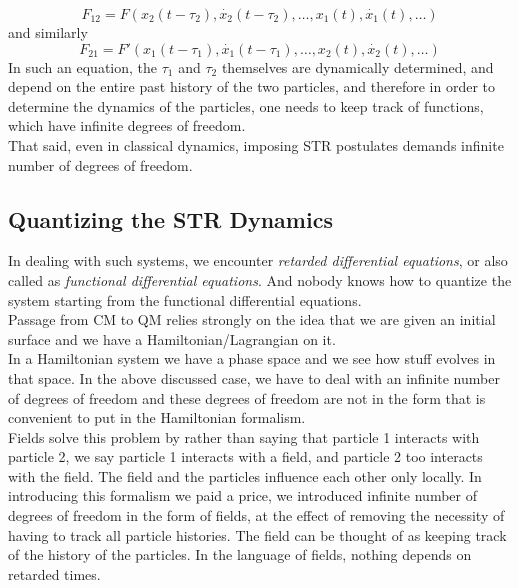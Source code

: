 \documentclass[11pt, notitlepage]{report}
\numberwithin{equation}{section}
\begin{document}
    
    
    \begin{equation}
        F_{12} = F(x_2(t-\tau_2), \dot{x_2}(t-\tau_2), \dots, x_1(t), \dot{x_1}(t), \dots)
    \end{equation}
    and similarly
    \begin{equation}
        F_{21} = F'(x_1(t-\tau_1), \dot{x_1}(t-\tau_1), \dots, x_2(t), \dot{x_2}(t), \dots)
    \end{equation}
    In such an equation, the \(\tau_1\) and \(\tau_2\) themselves are dynamically determined, and depend on the entire past history of the two particles, and therefore in order to determine the dynamics of the particles, one needs to keep track of functions, which have infinite degrees of freedom. \\

    That said, even in classical dynamics, imposing STR postulates demands infinite number of degrees of freedom. 

    \subsection{Quantizing the STR Dynamics}
    In dealing with such systems, we encounter \textit{retarded differential equations}, or also called as \textit{functional differential equations}. And nobody knows how to quantize the system starting from the functional differential equations.\\

    Passage from CM to QM relies strongly on the idea that we are given an initial surface and we have a Hamiltonian/Lagrangian on it.\\
    In a Hamiltonian system we have a phase space and we see how stuff evolves in that space. In the above discussed case, we have to deal with an infinite number of degrees of freedom and these degrees of freedom are not in the form that is convenient to put in the Hamiltonian formalism.\\

    Fields solve this problem by rather than saying that particle 1 interacts with particle 2, we say particle 1 interacts with a field, and particle 2 too interacts with the field. The field and the particles influence each other only locally. In introducing this formalism we paid a price, we introduced infinite number of degrees of freedom in the form of fields, at the effect of removing the necessity of having to track all particle histories. The field can be thought of as keeping track of the history of the particles. In the language of fields, nothing depends on retarded times. \\
\end{document}
